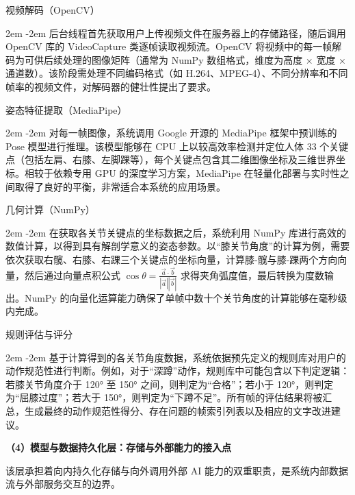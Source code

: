 \documentclass[UTF8,twoside]{ctexrep}
\makeatletter
\def@NAT@last@yr{\@citea}%
\def@NAT@last@yr{-\NAT@penalty}%
\newcommand{\listbodyaligntext}[1]{%
  \par\begingroup
    \parindent=0pt
    \parshape=2 2em \dimexpr\textwidth-2em\relax 0pt \textwidth
    \noindent\ignorespaces#1\unskip\par
  \endgroup
}
\makeatother
\begin{document}
\begin{researchlist}
  
  \item 视频解码（OpenCV）
  \listbodyaligntext{后台线程首先获取用户上传视频文件在服务器上的存储路径，随后调用 OpenCV 库的 VideoCapture 类逐帧读取视频流。OpenCV 将视频中的每一帧解码为可供后续处理的图像矩阵（通常为 NumPy 数组格式，维度为高度 × 宽度 × 通道数）。该阶段需处理不同编码格式（如 H.264、MPEG-4）、不同分辨率和不同帧率的视频文件，对解码器的健壮性提出了要求。}

  
  \item 姿态特征提取（MediaPipe）
  \listbodyaligntext{对每一帧图像，系统调用 Google 开源的 MediaPipe 框架中预训练的 Pose 模型进行推理。该模型能够在 CPU 上以较高效率检测并定位人体 33 个关键点（包括左肩、右膝、左脚踝等），每个关键点包含其二维图像坐标及三维世界坐标。相较于依赖专用 GPU 的深度学习方案，MediaPipe 在轻量化部署与实时性之间取得了良好的平衡，非常适合本系统的应用场景。}

  
  \item 几何计算（NumPy）
  \listbodyaligntext{在获取各关节关键点的坐标数据之后，系统利用 NumPy 库进行高效的数值计算，以得到具有解剖学意义的姿态参数。以“膝关节角度”的计算为例，需要依次获取右髋、右膝、右踝三个关键点的坐标向量，计算膝-髋与膝-踝两个方向向量，然后通过向量点积公式 $\cos\theta = \frac{\vec{a} \cdot \vec{b}}{|\vec{a}| |\vec{b}|}$ 求得夹角弧度值，最后转换为度数输出。NumPy 的向量化运算能力确保了单帧中数十个关节角度的计算能够在毫秒级内完成。}

  
  \item 规则评估与评分
  \listbodyaligntext{基于计算得到的各关节角度数据，系统依据预先定义的规则库对用户的动作规范性进行判断。例如，对于“深蹲”动作，规则库中可能包含以下判定逻辑：若膝关节角度介于 120° 至 150° 之间，则判定为“合格”；若小于 120°，则判定为“屈膝过度”；若大于 150°，则判定为“下蹲不足”。所有帧的评估结果将被汇总，生成最终的动作规范性得分、存在问题的帧索引列表以及相应的文字改进建议。}
\end{researchlist}

\textbf{（4）模型与数据持久化层：存储与外部能力的接入点}

该层承担着向内持久化存储与向外调用外部 AI 能力的双重职责，是系统内部数据流与外部服务交互的边界。
\end{document}
